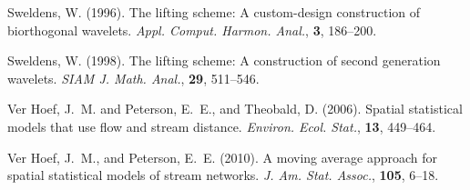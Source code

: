 \documentclass[11pt,titlepage]{article}
\begin{document}
\begin{thebibliography}{}
Sweldens, W. (1996). The lifting scheme: A custom-design construction of biorthogonal wavelets. {\em Appl. Comput. Harmon. Anal.}, {\bf 3}, 186--200.

Sweldens, W. (1998). The lifting scheme: A construction of second generation wavelets. {\em SIAM J. Math. Anal.}, {\bf 29}, 511--546.

Ver Hoef, J.~M. and Peterson, E.~E., and Theobald, D. (2006). Spatial statistical models that use flow and stream distance. {\em Environ. Ecol. Stat.}, {\bf 13}, 449--464.

Ver Hoef, J.~M., and Peterson, E.~E. (2010). A moving average approach for spatial statistical models of stream networks. {\em J. Am. Stat. Assoc.}, {\bf 105}, 6--18.

\end{thebibliography}
\end{document}
